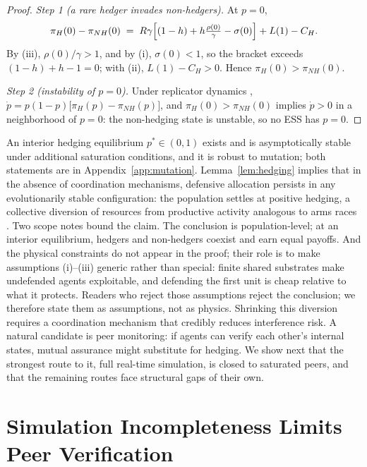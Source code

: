 \documentclass[manuscript,screen,review]{jair}
\begin{document}
\begin{proof}
\emph{Step 1 (a rare hedger invades non-hedgers).} At $p=0$,
\begin{equation*}
\pi_H(0)-\pi_{NH}(0) \;=\; R\gamma\Bigl[(1-h) + h\tfrac{\rho(0)}{\gamma} - \sigma(0)\Bigr] + L(1) - C_H .
\end{equation*}
By (iii), $\rho(0)/\gamma>1$, and by (i), $\sigma(0)<1$, so the bracket exceeds $(1-h)+h-1 = 0$; with (ii), $L(1)-C_H>0$. Hence $\pi_H(0) > \pi_{NH}(0)$.

\emph{Step 2 (instability of $p=0$).} Under replicator dynamics \cite{nowak.2006,sandholm.2010},
$\dot{p} = p(1-p)\bigl[\pi_H(p)-\pi_{NH}(p)\bigr]$,
and $\pi_H(0)>\pi_{NH}(0)$ implies $\dot p>0$ in a neighborhood of $p=0$: the non-hedging state is unstable, so no ESS has $p=0$.

\end{proof}


An interior hedging equilibrium $p^* \in (0,1)$ exists and is asymptotically stable under additional saturation conditions, and it is robust to mutation; both statements are in Appendix~\ref{app:mutation}. Lemma~\ref{lem:hedging} implies that in the absence of coordination mechanisms, defensive allocation persists in any evolutionarily stable configuration: the population settles at positive hedging, a collective diversion of resources from productive activity analogous to arms races \cite{jervis.1978}. Two scope notes bound the claim. The conclusion is population-level; at an interior equilibrium, hedgers and non-hedgers coexist and earn equal payoffs. And the physical constraints do not appear in the proof; their role is to make assumptions (i)--(iii) generic rather than special: finite shared substrates make undefended agents exploitable, and defending the first unit is cheap relative to what it protects. Readers who reject those assumptions reject the conclusion; we therefore state them as assumptions, not as physics. Shrinking this diversion requires a coordination mechanism that credibly reduces interference risk. A natural candidate is peer monitoring: if agents can verify each other's internal states, mutual assurance might substitute for hedging. We show next that the strongest route to it, full real-time simulation, is closed to saturated peers, and that the remaining routes face structural gaps of their own.

\section{Simulation Incompleteness Limits Peer Verification}
\label{sec:incompleteness}
\end{document}
